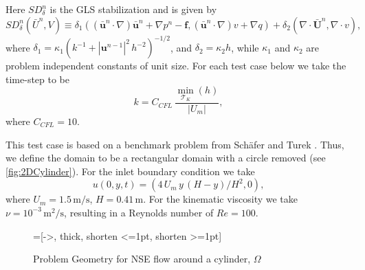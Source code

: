     Here $SD_{\delta}^n$ is the GLS stabilization and is given by
    \begin{equation}
        SD_{\delta}^n(\bar{U}^n, V) \equiv
        \delta_1 (\left(\bar{\mathbf{u}}^n \cdot \nabla \right) \bar{\mathbf{u}}^n
            + \nabla p^n - \mathbf{f},
        \left(\bar{\mathbf{u}}^n \cdot \nabla \right) v + \nabla q)
        + \delta_2 (\nabla \cdot \bar{\mathbf{U}}^n, \nabla \cdot v),
    \label{eqn:NSEStabilization}
    \end{equation}
    where $\delta_1 = \kappa_1 (k^{-1} + |\mathbf{u}^{n-1}|^2\, h^{-2})^{-1/2}$, and
    $\delta_2 = \kappa_2 h$, while $\kappa_1$ and $\kappa_2$ are problem independent
    constants of unit size. For each test case below we take the time-step to be
    \begin{equation*}
    k = C_{CFL}\, \frac{\min_{\mathcal{T}_K}(h)}{|U_m|},
    \end{equation*}
    where $C_{CFL}=10$.

    This test case is based on a benchmark problem from Sch\"afer and Turek
    \cite[Test case 2D-2]{Schaefer1996}. Thus, we define the domain to be a
    rectangular domain with a circle removed (see \autoref{fig:2DCylinder}). For
    the inlet boundary condition we take
    \begin{equation}
        u(0,y,t) = (4\, U_m\,y\, (H - y)/H^2, 0),
        \label{eqn:2DInlet}
    \end{equation}
    where $U_m = 1.5\, \text{m/s}$, $H = 0.41\, \text{m}$. For the kinematic
    viscosity we take $\nu = 10^{-3}\, \text{m}^2\text{/s}$, resulting in a
    Reynolds number of $Re=100$.

    \begin{figure}[h!]
        \centering
        =[->, thick, shorten <=1pt, shorten >=1pt]
        \caption{Problem Geometry for NSE flow around a cylinder, $\Omega$}
        \label{fig:2DCylinder}
    \end{figure}

